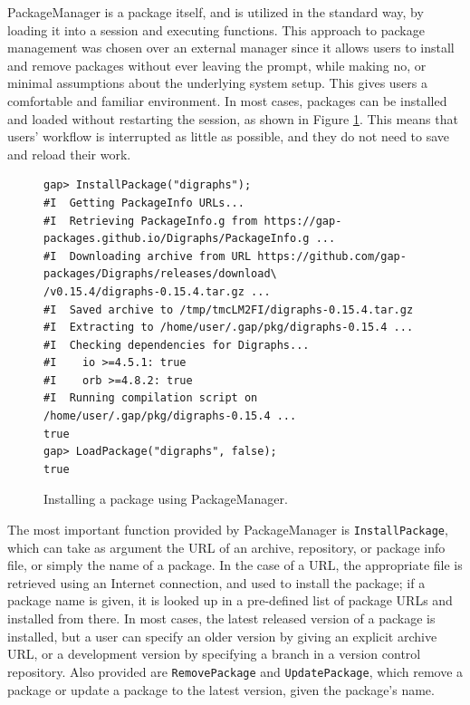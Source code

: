{\sf PackageManager} is a \GAP package itself, and is utilized in the
standard way, by loading it into a \GAP session and executing \GAP
functions. This approach to package management was chosen over an external
manager since it allows users to install and remove packages without ever
leaving the \GAP prompt, while making no, or minimal assumptions about
the underlying system setup. This gives
users a comfortable and familiar environment. In most cases, packages can be installed
and loaded without restarting the session, as shown in Figure \ref{fig:pkgman-sample-b}.
This means that users' workflow is interrupted as little as possible, and they do
not need to save and reload their work.

\begin{figure}[!ht]
  \begin{mdframed}
    \centering
    {\tiny
\begin{verbatim}
gap> InstallPackage("digraphs");
#I  Getting PackageInfo URLs...
#I  Retrieving PackageInfo.g from https://gap-packages.github.io/Digraphs/PackageInfo.g ...
#I  Downloading archive from URL https://github.com/gap-packages/Digraphs/releases/download\
/v0.15.4/digraphs-0.15.4.tar.gz ...
#I  Saved archive to /tmp/tmcLM2FI/digraphs-0.15.4.tar.gz
#I  Extracting to /home/user/.gap/pkg/digraphs-0.15.4 ...
#I  Checking dependencies for Digraphs...
#I    io >=4.5.1: true
#I    orb >=4.8.2: true
#I  Running compilation script on /home/user/.gap/pkg/digraphs-0.15.4 ...
true
gap> LoadPackage("digraphs", false);
true
\end{verbatim}
    }
    \end{mdframed}
    \caption{Installing a package using {\sf PackageManager}.}
    \label{fig:pkgman-sample-b}
\end{figure}

The most important function provided by {\sf PackageManager} is
\texttt{InstallPackage}, which can take as argument the URL of an archive, repository, or package info file, or simply the
name of a package.  In the case of a URL, the appropriate file is retrieved
using an Internet connection, and used to install the package; if a package name
is given, it is looked up in a pre-defined list of package URLs and installed
from there.  In most cases, the latest released version of a package is
installed, but a user can specify an older version by giving an explicit archive
URL, or a development version by specifying a branch in a
version control repository.
Also provided are \texttt{RemovePackage} and \texttt{UpdatePackage}, which
remove a package or update a package to the latest version, given the package's
name.

